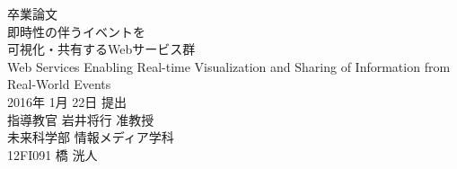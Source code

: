 \thispagestyle{empty}
\begin{center}
\vspace*{-1cm}
\Huge{卒業論文}\\
\vspace{1cm}
\LARGE{即時性の伴うイベントを\\可視化・共有するWebサービス群}\\
\vspace{0.2cm}
\large{Web Services Enabling Real-time Visualization and Sharing of Information from Real-World Events}\\
\vspace{2cm}
\Large{2016年 1月 22日 提出}\\
\vspace{2cm}
\LARGE{指導教官 岩井将行 准教授}\\
\vspace{1cm}
\LARGE{未来科学部 情報メディア学科}\\
\vspace{1cm}
\huge{12FI091 橋 洸人}\\
\end{center}
